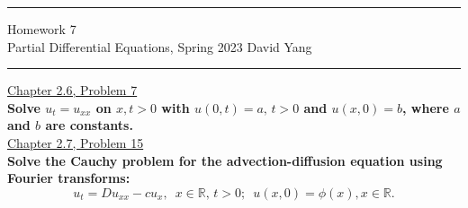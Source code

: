 \documentclass[11pt]{article}
\begin{document}
	\hrule
	\begin{center}
		{\Large Homework 7} \\ %
		\vspace{0.2cm}
		Partial Differential Equations, Spring 2023 \hfill David Yang %
	\end{center}

\hrule

\vspace{1em}


\underline{Chapter 2.6, Problem 7} \\

\textbf{Solve $u_t =u_{xx}$ on $x,t>0$ with $u(0,t)=a, \, t>0$ and $u(x,0)=b$, where $a$ and $b$ are constants.} \\

\underline{Chapter 2.7, Problem 15} \\

\textbf{Solve the Cauchy problem for the advection-diffusion equation using Fourier transforms:}
\[u_t = Du_{xx} - cu_x, \, \, \, x \in \mathbb{R}, \, t>0; \, \, \, u(x,0)=\phi(x), x\in\mathbb{R}.\]
\end{document}
